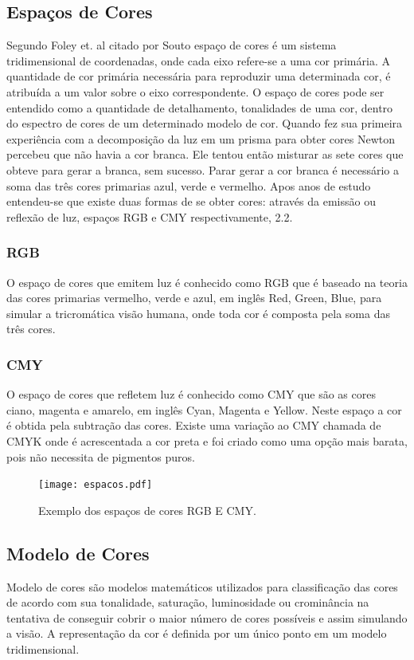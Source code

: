 \subsection{Espaços de Cores}
Segundo Foley et. al citado por Souto\cite{Souto:2003} espaço de cores é um sistema tridimensional de
coordenadas, onde cada eixo refere-se a uma cor primária. A quantidade de cor primária
necessária para reproduzir uma determinada cor, é atribuída a um valor sobre o eixo
correspondente. O espaço de cores pode ser entendido como a quantidade de detalhamento, tonalidades de uma cor, dentro do espectro de cores de um determinado modelo de cor. 
Quando fez sua primeira experiência com a decomposição da luz em um prisma para obter cores Newton percebeu que não havia a cor branca. Ele tentou então misturar as sete cores que obteve para gerar a branca, sem sucesso. Parar gerar a cor branca é necessário a soma das três cores primarias azul, verde e vermelho. Apos anos de estudo entendeu-se que existe duas formas de se obter cores: através da emissão ou reflexão de luz, espaços RGB e CMY respectivamente, \figurename{ 2.2}. 

\subsubsection{RGB}
O espaço de cores que emitem luz é conhecido como RGB que é baseado na teoria das cores primarias vermelho, verde e azul, em inglês Red, Green, Blue, para simular a tricromática visão humana, onde toda cor é composta pela soma das três cores.
\subsubsection{CMY}
O espaço de cores que refletem luz é conhecido como CMY que são as cores ciano, magenta e amarelo, em inglês Cyan, Magenta e Yellow. Neste espaço a cor é obtida pela subtração das cores. Existe uma variação ao CMY chamada de CMYK onde é acrescentada a cor preta e foi criado 	como uma opção mais barata, pois não necessita de pigmentos puros\cite{Rocha:2010}.
\newline
\begin{figure}[!h]
	\centering
	\texttt{[image: espacos.pdf]}
	\caption{Exemplo dos espaços de cores RGB E CMY.}
	\label{Espaco de Cores}
\end{figure}
\subsection{Modelo de Cores}
Modelo de cores são modelos matemáticos utilizados para classificação das cores de acordo com sua tonalidade, saturação, luminosidade ou crominância na tentativa de conseguir cobrir o maior número de cores possíveis e assim simulando a visão. A representação da cor é definida por um único ponto em um modelo tridimensional. 
